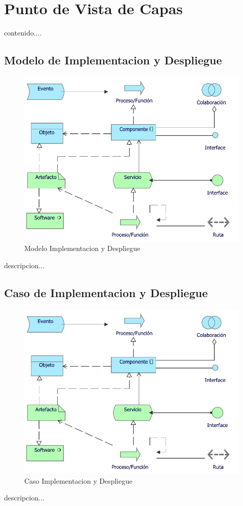 \section{Punto de Vista de Capas}
contenido....
\subsection{Modelo de Implementacion y Despliegue}
\begin{figure}[h!]
	\centering
	\includegraphics[width=.5\linewidth]{imgs/modelo/Implementacion}
	\caption{Modelo Implementacion y Despliegue}
\end{figure}
descripcion...

\newpage

\subsection{Caso  de Implementacion y Despliegue}
\begin{figure}[h!]
	\centering
	\includegraphics[width=.5\linewidth]{imgs/caso/Implementacion}
	\caption{Caso Implementacion y Despliegue}
\end{figure}
descripcion...